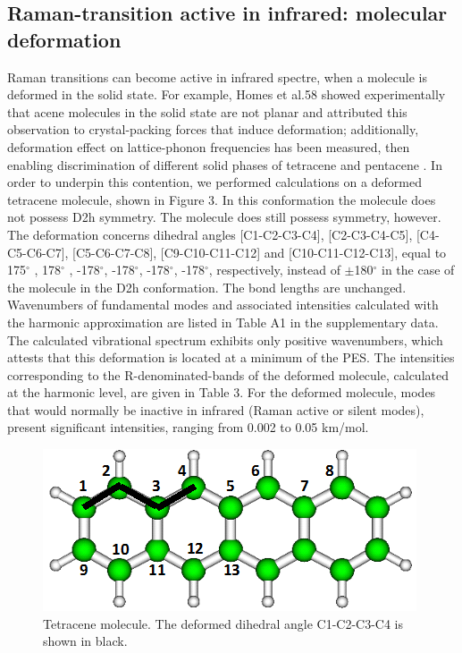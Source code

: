 \subsection*{Raman-transition active in infrared: molecular deformation}

Raman transitions can become active in infrared spectre, when a molecule is deformed in the solid state. For example, Homes et al.58 showed experimentally that acene molecules in the solid state are not planar and attributed this observation to crystal-packing forces that induce deformation; additionally, deformation effect on lattice-phonon frequencies has been measured, then enabling discrimination of different solid phases of tetracene \cite{venuti2004phonons} and pentacene \cite{venuti2002probing,brillante2002raman}. 
In order to underpin this contention, we performed calculations on a deformed tetracene molecule, shown in Figure 3. In this conformation the molecule does not possess D2h symmetry. The molecule does still possess symmetry, however. The deformation concerns dihedral angles [C1-C2-C3-C4], [C2-C3-C4-C5], [C4-C5-C6-C7], [C5-C6-C7-C8], [C9-C10-C11-C12] and [C10-C11-C12-C13], equal to 175$^{\circ}$ , 178$^{\circ}$ , -178$^{\circ}$, -178$^{\circ}$, -178$^{\circ}$, -178$^{\circ}$, respectively, instead of $\pm$180$^{\circ}$ in the case of the molecule in the D2h conformation. The bond lengths are unchanged. Wavenumbers of fundamental modes and associated intensities calculated with the harmonic approximation are listed in Table A1 in the supplementary data. The calculated vibrational spectrum exhibits only positive wavenumbers, which attests that this deformation is located at a minimum of the PES. The intensities corresponding to the R-denominated-bands of the deformed molecule, calculated at the harmonic level, are given in Table 3. For the deformed molecule, modes that would normally be inactive in infrared (Raman active or silent modes), present significant intensities, ranging from 0.002 to 0.05 km/mol.

\begin{figure}[h]
	\centering
	\includegraphics[scale=0.6]{image/Tetracene-def}
	\caption[The deformed dihedral angle C1-C2-C3-C4 in Tetracene molecule]{Tetracene molecule. The deformed dihedral angle C1-C2-C3-C4 is shown in black.}
\end{figure}

